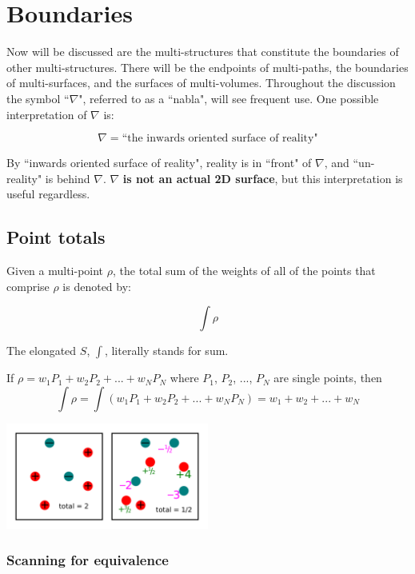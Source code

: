 



\chapter{Boundaries}\label{chap:boundaries}

Now will be discussed are the multi-structures that constitute the boundaries of other multi-structures. There will be the endpoints of multi-paths, the boundaries of multi-surfaces, and the surfaces of multi-volumes. Throughout the discussion the symbol ``\(\nabla\)", referred to as a ``nabla", will see frequent use. One possible interpretation of \(\nabla\) is:

\[\nabla = \text{``the inwards oriented surface of reality"}\]

By ``inwards oriented surface of reality", reality is in ``front" of \(\nabla\), and ``un-reality" is behind \(\nabla\). \(\nabla\) {\bf is not an actual 2D surface}, but this interpretation is useful regardless.



\section{Point totals}

Given a multi-point \(\rho\), the total sum of the weights of all of the points that comprise \(\rho\) is denoted by:

\[\int \rho\]

The elongated \(S\), \(\int\), literally stands for sum.

If \(\rho = w_1 P_1 + w_2 P_2 + ... + w_N P_N\) where \(P_1\), \(P_2\), ..., \(P_N\) are single points, then
\[\int \rho = \int (w_1 P_1 + w_2 P_2 + ... + w_N P_N) = w_1 + w_2 + ... + w_N\]

\begin{center} 
\includegraphics[width = 0.5\textwidth]{Point_totals/multi-point_sums}
\end{center}


\subsection{Scanning for equivalence}

